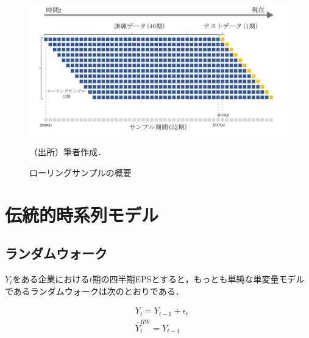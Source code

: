 \documentclass[a4paper，11pt]{jsarticle}
\begin{document}
\begin{figure}[tbp]
  \centering
  \caption{ローリングサンプルの概要}
  \label{fig:rolling}
  \includegraphics[width=0.8\linewidth]{./img/_rolling_sample.pdf}
  \begin{threeparttable}
  \begin{tablenotes}
    \item[]（出所）筆者作成．
  \end{tablenotes}
  \end{threeparttable}  
\end{figure}

\section{伝統的時系列モデル}

\subsection{ランダムウォーク}

$Y_t$をある企業における$t$期の四半期EPSとすると，もっとも単純な単変量モデルであるランダムウォークは次のとおりである．

\begin{equation}
  \begin{split}
    & Y_t = Y_{t-1} + \epsilon_t \\
    & \hat{Y}_t^{RW} = Y_{t-1} \\
  \end{split}
\end{equation}        

\end{document}
